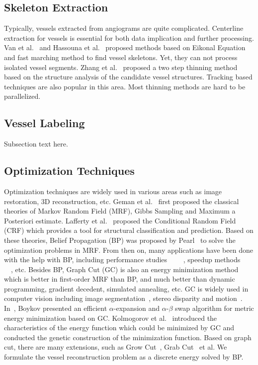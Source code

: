 \documentclass[journal]{IEEEtran}
\begin{document}
\subsection{Skeleton Extraction}
Typically, vessels extracted from angiograms are quite complicated.  Centerline extraction for vessels is essential for both data implication and further processing. Van et al.~\cite{van2007subvoxel} and Hassouna et
al.~\cite{Hassouna2007} proposed methods based on Eikonal Equation and
fast marching method to find vessel skeletons. Yet, they can not
process isolated vessel segments. Zhang et
al.~\cite{two_step_thinning} proposed a two step thinning method based
on the structure analysis of the candidate vessel structures. Tracking
based techniques are also popular in this area. Most thinning methods
are hard to be parallelized.



\subsection{Vessel Labeling}
Subsection text here.

\subsection{Optimization Techniques}
Optimization techniques are widely used in various areas such as image restoration, 3D reconstruction, etc. Geman et al.~\cite{geman1984stochastic} first
proposed the classical theories of Markov Random Field (MRF), Gibbs
Sampling and Maximum a Posteriori estimate. Lafferty et
al.~\cite{lafferty2001conditional} proposed the Conditional Random
Field (CRF) which provides a tool for structural classification and
prediction. Based on these theories, Belief Propagation (BP) was
proposed by Pearl~\cite{pearl1982reverend} to solve the optimization
problems in MRF. From then on, many applications have been done with
the help with BP, including performance
studies~\cite{Meltzer2005}~\cite{murphy1999loopy}
~\cite{szeliski2008comparative}~\cite{tappen2003comparison}, speedup
methods~\cite{potetz2008efficient}~\cite{brunton2006belief}
~\cite{coughlan2007dynamic}~\cite{felzenszwalb2006efficient}, etc.
Besides BP, Graph Cut (GC) is also an energy minimization method which
is better in first-order MRF than BP, and much better than dynamic
programming, gradient decedent, simulated annealing, etc. GC is widely
used in computer vision including image
segmentation~\cite{boykov2001interactive}, stereo disparity and
motion~\cite{boykov2001fast}. In~\cite{boykov2001fast}, Boykov
presented an efficient $\alpha$-expansion and $\alpha$-$\beta$ swap
algorithm for metric energy minimization based on GC. Kolmogorov et
al.~\cite{kolmogorov2004energy} introduced the characteristics of the
energy function which could be minimized by GC and conducted the
genetic construction of the minimization function. Based on graph cut,
there are many extensions, such as Grow
Cut~\cite{vezhnevets2005growcut}, Grab Cut~\cite{rother2004grabcut} et
al. We formulate the vessel reconstruction problem as a discrete
energy solved by BP.
\end{document}
